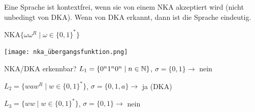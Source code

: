 \begin{remark}
    Eine Sprache ist kontextfrei, wenn sie von einem NKA akzeptiert wird (nicht unbedingt von DKA).
    Wenn von DKA erkannt, dann ist die Sprache eindeutig.
\end{remark}

\begin{minipage}{0.4\linewidth}
    \begin{concept}{NKA}$\{\omega \omega^{R} \mid \omega \in\{0,1\}^{*}\}$
    \end{concept}
\end{minipage}
\begin{minipage}{0.6\linewidth}
        \texttt{[image: nka\_übergangsfunktion.png]}
\end{minipage}


\begin{example2}{NKA/DKA erkennbar?}
    $L_1 = \{0^n1^n0^n \mid n \in \mathbb{N}\}$, $\sigma = \{0,1\} \rightarrow$ nein

    $L_2 = \{waw^R \mid w \in \{0,1\}^*\}$, $\sigma = \{0,1,a\} \rightarrow$ ja (DKA)

    $L_3 = \{ww \mid w \in \{0,1\}^*\}$, $\sigma = \{0,1\} \rightarrow$ nein
\end{example2}


